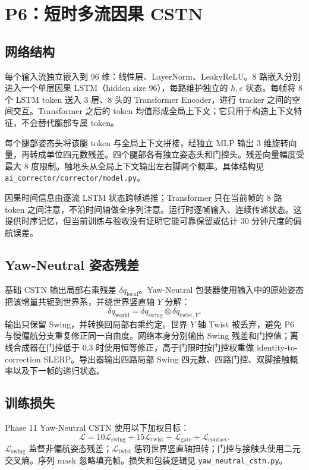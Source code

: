 \documentclass[UTF8,11pt,a4paper]{ctexart}
\begin{document}
\section{P6：短时多流因果 CSTN}

\subsection{网络结构}
每个输入流独立嵌入到 96 维：线性层、LayerNorm、LeakyReLU。8 路嵌入分别进入一个单层因果 LSTM（hidden size 96），每路维护独立的 \(h,c\) 状态。每帧将 8 个 LSTM token 送入 3 层、8 头的 Transformer Encoder，进行 tracker 之间的空间交互。Transformer 之后的 token 均值形成全局上下文；它只用于构造上下文特征，不会替代腿部专属 token。

每个腿部姿态头将该腿 token 与全局上下文拼接，经独立 MLP 输出 3 维旋转向量，再转成单位四元数残差。四个腿部各有独立姿态头和门控头。残差向量幅度受最大 8 度限制。触地头从全局上下文输出左右脚两个概率。具体结构见 \texttt{ai\_corrector/corrector/model.py}。

因果时间信息由逐流 LSTM 状态跨帧递推；Transformer 只在当前帧的 8 路 token 之间注意，不沿时间轴做全序列注意。运行时逐帧输入、连续传递状态。这提供时序记忆，但当前训练与验收没有证明它能可靠保留或估计 30 分钟尺度的偏航误差。

\subsection{Yaw-Neutral 姿态残差}
基础 CSTN 输出局部右乘残差 \(\delta q_{\mathrm{local}}\)。Yaw-Neutral 包装器使用输入中的原始姿态把该增量共轭到世界系，并绕世界竖直轴 \(Y\) 分解：
\[
\delta q_{\mathrm{world}}
=\delta q_{\mathrm{swing}}\otimes\delta q_{\mathrm{twist},Y}.
\]
输出只保留 Swing，并转换回局部右乘约定。世界 \(Y\) 轴 Twist 被丢弃，避免 P6 与慢偏航分支重复修正同一自由度。网络本身分别输出 Swing 残差和门控值；离线合成器在门控低于 0.3 时使用恒等修正，高于门限时按门控权重做 identity-to-correction SLERP。导出器输出四路局部 Swing 四元数、四路门控、双脚接触概率以及下一帧的递归状态。

\subsection{训练损失}
Phase 11 Yaw-Neutral CSTN 使用以下加权目标：
\[
\mathcal{L}
=10\mathcal{L}_{\mathrm{swing}}
+15\mathcal{L}_{\mathrm{twist}}
+\mathcal{L}_{\mathrm{gate}}
+\mathcal{L}_{\mathrm{contact}}.
\]
\(\mathcal{L}_{\mathrm{swing}}\) 监督非偏航姿态残差；\(\mathcal{L}_{\mathrm{twist}}\) 惩罚世界竖直轴扭转；门控与接触头使用二元交叉熵。序列 mask 忽略填充帧。损失和包装逻辑见 \texttt{yaw\_neutral\_cstn.py}。
\end{document}
